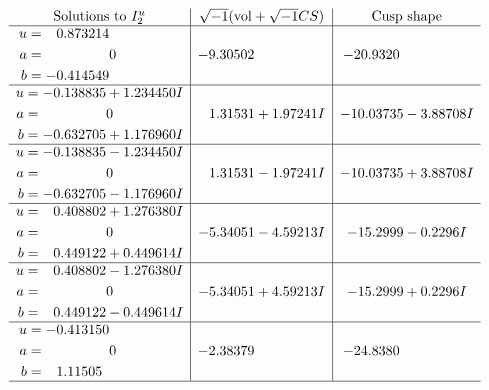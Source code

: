 \documentclass[1p]{elsarticle_modified}
\theoremstyle{definition}
\newcommand{\I}{\sqrt{-1}}
\begin{document}
$$\begin{array}{c|c|c}  
\text{Solutions to }I^u_{2}& \I (\text{vol} + \sqrt{-1}CS) & \text{Cusp shape}\\
 \hline 
\begin{aligned}
u &= \phantom{-}0.873214\phantom{ +0.000000I} \\
a &= \phantom{-0.000000 } 0 \\
b &= -0.414549\phantom{ +0.000000I}\end{aligned}
 & -9.30502\phantom{ +0.000000I} & -20.9320\phantom{ +0.000000I} \\ \hline\begin{aligned}
u &= -0.138835 + 1.234450 I \\
a &= \phantom{-0.000000 } 0 \\
b &= -0.632705 + 1.176960 I\end{aligned}
 & \phantom{-}1.31531 + 1.97241 I & -10.03735 - 3.88708 I \\ \hline\begin{aligned}
u &= -0.138835 - 1.234450 I \\
a &= \phantom{-0.000000 } 0 \\
b &= -0.632705 - 1.176960 I\end{aligned}
 & \phantom{-}1.31531 - 1.97241 I & -10.03735 + 3.88708 I \\ \hline\begin{aligned}
u &= \phantom{-}0.408802 + 1.276380 I \\
a &= \phantom{-0.000000 } 0 \\
b &= \phantom{-}0.449122 + 0.449614 I\end{aligned}
 & -5.34051 - 4.59213 I & -15.2999 - 0.2296 I \\ \hline\begin{aligned}
u &= \phantom{-}0.408802 - 1.276380 I \\
a &= \phantom{-0.000000 } 0 \\
b &= \phantom{-}0.449122 - 0.449614 I\end{aligned}
 & -5.34051 + 4.59213 I & -15.2999 + 0.2296 I \\ \hline\begin{aligned}
u &= -0.413150\phantom{ +0.000000I} \\
a &= \phantom{-0.000000 } 0 \\
b &= \phantom{-}1.11505\phantom{ +0.000000I}\end{aligned}
 & -2.38379\phantom{ +0.000000I} & -24.8380\phantom{ +0.000000I}\\
 \hline 
 \end{array}$$\newpage
\end{document}
